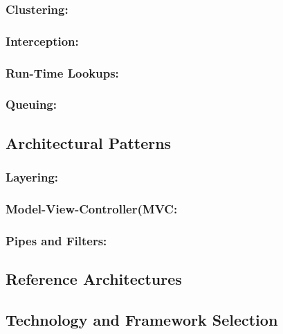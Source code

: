 \documentclass[12pt]{article}
\begin{document}
	\subsubsection {Clustering:} 


	\subsubsection{Interception:}
	

	\subsubsection {Run-Time Lookups:}


	\subsubsection {Queuing:}



	\subsection{Architectural Patterns}


	\subsubsection{Layering:} 



	\subsubsection{Model-View-Controller(MVC:}



	\subsubsection{Pipes and Filters:}



	\subsection{Reference Architectures}



	\subsection{Technology and Framework Selection}
\end{document}
